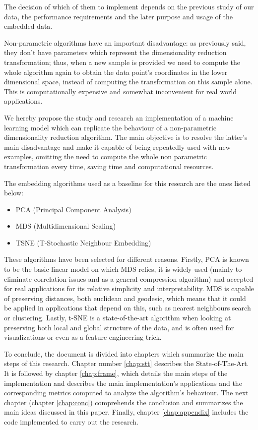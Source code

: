 \documentclass[a4paper,11pt,spanish]{report}
\begin{document}
The decision of which of them to implement depends on the previous study of our data, the performance requirements and the later purpose and usage of the embedded data.

Non-parametric algorithms have an important disadvantage: as previously said, they don't have parameters which represent the dimensionality reduction transformation; thus, when a new sample is provided we need to compute the whole algorithm again to obtain the data point's coordinates in the lower dimensional space, instead of computing the transformation on this sample alone. This is computationally expensive and somewhat inconvenient for real world applications.

We hereby propose the study and research an implementation of a machine learning model which can replicate the behaviour of a non-parametric dimensionality reduction algorithm. The main objective is to resolve the latter's main disadvantage and make it capable of being repeatedly used with new examples, omitting the need to compute the whole non parametric transformation every time, saving time and computational resources.

The embedding algorithms used as a baseline for this research are the ones listed below:

\renewcommand{\labelitemi}{\textendash}
\begin{itemize}
\item PCA (Principal Component Analysis)
\item MDS (Multidimensional Scaling)
\item TSNE (T-Stochastic Neighbour Embedding)
\end{itemize}

These algorithms have been selected for different reasons. Firstly, PCA is known to be the basic linear model on which MDS relies, it is widely used (mainly to eliminate correlation issues and as a general compression algorithm) and accepted for real applications for its relative simplicity and interpretability. MDS is capable of preserving distances, both euclidean and geodesic, which means that it could be applied in applications that depend on this, such as nearest neighbours search or clustering. Lastly, t-SNE is a state-of-the-art algorithm when looking at preserving both local and global structure of the data, and is often used for visualizations or even as a feature engineering trick.

To conclude, the document is divided into chapters which summarize the main steps of this research. Chapter number \ref{chap:stt} describes the State-of-The-Art. It is followed by chapter \ref{chap:frame}, which details the main steps of the implementation and describes the main implementation's applications and the corresponding metrics computed to analyze the algorithm's behaviour. The next chapter (chapter \ref{chap:conc}) comprehends the conclusion and summarizes the main ideas discussed in this paper. Finally, chapter \ref{chap:appendix} includes the code implemented to carry out the research.
\end{document}
